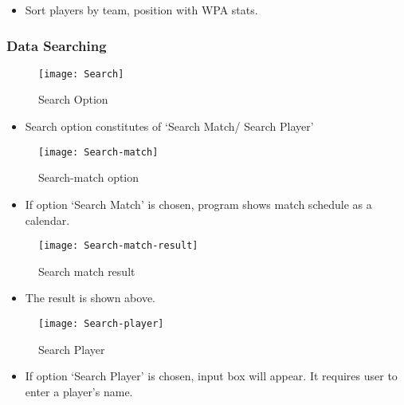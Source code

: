 \documentclass[conference,compsoc, twocolumn]{IEEEtran}
\begin{document}
\begin{itemize}
\item Sort players by team, position with WPA stats.
\end{itemize}


\subsubsection{Data Searching}
\begin{figure}[h]
\centering\texttt{[image: Search]}
\caption{Search Option}
\end{figure}

\begin{itemize}
\item Search option constitutes of  ‘Search Match/ Search Player’
\end{itemize}

\begin{figure}[h]
\centering\texttt{[image: Search-match]}
\caption{Search-match option}
\end{figure}

\begin{itemize}
\item If option ‘Search Match’ is chosen, program shows match schedule as a calendar.
\end{itemize}

\begin{figure}[h]
\centering\texttt{[image: Search-match-result]}
\caption{Search match result}
\end{figure}

\begin{itemize}
\item The result is shown above.
\end{itemize}

\begin{figure}[h]
\centering\texttt{[image: Search-player]}
\caption{Search Player}
\end{figure}

\begin{itemize}
\item If option ‘Search Player’ is chosen, input box will appear. It requires user to enter a player’s name.
\end{itemize}
\end{document}
